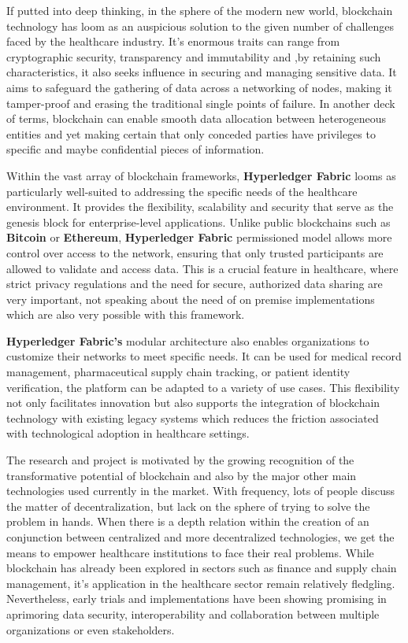 If putted into deep thinking, in the sphere of the modern new world, blockchain technology has loom as an auspicious solution to the given number of challenges faced by the healthcare industry. It's enormous traits can range from cryptographic security, transparency and immutability and ,by retaining such characteristics, it also seeks influence in securing and managing sensitive data. It aims to safeguard the gathering of data across a networking of nodes, making it tamper-proof and erasing the traditional single points of failure. In another deck of terms, blockchain can enable smooth data allocation between heterogeneous entities and yet making certain that only conceded parties have privileges to specific and maybe confidential pieces of information.

Within the vast array of blockchain frameworks, \textbf{Hyperledger Fabric} looms as particularly well-suited to addressing the specific needs of the healthcare environment. It provides the flexibility, scalability and security that serve as the genesis block for enterprise-level applications. Unlike public blockchains such as \textbf{Bitcoin} or \textbf{Ethereum}, \textbf{Hyperledger Fabric} permissioned model allows more control over access to the network, ensuring that only trusted participants are allowed to validate and access data. This is a crucial feature in healthcare, where strict privacy regulations and the need for secure, authorized data sharing are very important, not speaking about the need of on premise implementations which are also very possible with this framework.

\textbf{Hyperledger Fabric's} modular architecture also enables organizations to customize their networks to meet specific needs. It can be used for medical record management, pharmaceutical supply chain tracking, or patient identity verification, the platform can be adapted to a variety of use cases. This flexibility not only facilitates innovation but also supports the integration of blockchain technology with existing legacy systems which reduces the friction associated with technological adoption in healthcare settings.

The research and project is motivated by the growing recognition of the transformative potential of blockchain and also by the major other main technologies used currently in the market. With frequency, lots of people discuss the matter of decentralization, but lack on the sphere of trying to solve the problem in hands. When there is a depth relation within the creation of an conjunction between centralized and more decentralized technologies, we get the means to empower healthcare institutions to face their real problems. While blockchain has already been explored in sectors such as finance and supply chain management, it's application in the healthcare sector remain relatively fledgling. Nevertheless, early trials and implementations have been showing promising in aprimoring data security, interoperability and collaboration between multiple organizations or even stakeholders.

